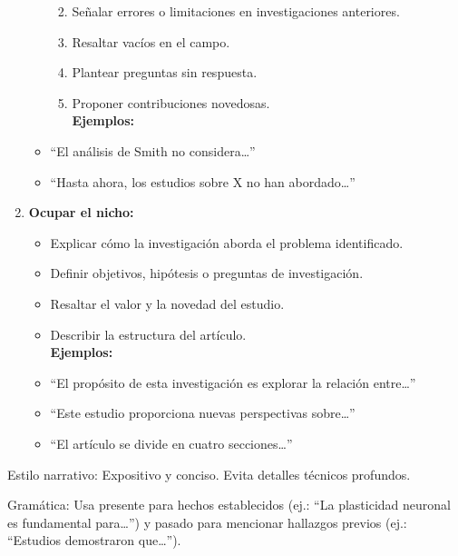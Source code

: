 \documentclass[
]{article}
\providecommand{\tightlist}{%
  \setlength{\itemsep}{0pt}\setlength{\parskip}{0pt}}\usepackage{longtable,booktabs,array}
\begin{document}
\begin{tcolorbox}
\begin{enumerate}
\begin{itemize}
    \begin{enumerate}
    \def\labelenumii{\alph{enumii})}
    \tightlist
    \item
      Señalar errores o limitaciones en investigaciones anteriores.\\
    \item
      Resaltar vacíos en el campo.\\
    \item
      Plantear preguntas sin respuesta.\\
    \item
      Proponer contribuciones novedosas.\\
      \textbf{Ejemplos:}\\
    \end{enumerate}
  \item
    ``El análisis de Smith no considera\ldots{}''\\
  \item
    ``Hasta ahora, los estudios sobre X no han abordado\ldots{}''
  \end{itemize}
\item
  \textbf{Ocupar el nicho:}

  \begin{itemize}
  \tightlist
  \item
    Explicar cómo la investigación aborda el problema identificado.\\
  \item
    Definir objetivos, hipótesis o preguntas de investigación.\\
  \item
    Resaltar el valor y la novedad del estudio.\\
  \item
    Describir la estructura del artículo.\\
    \textbf{Ejemplos:}\\
  \item
    ``El propósito de esta investigación es explorar la relación
    entre\ldots{}''\\
  \item
    ``Este estudio proporciona nuevas perspectivas sobre\ldots{}''\\
  \item
    ``El artículo se divide en cuatro secciones\ldots{}''
  \end{itemize}
\end{enumerate}

Estilo narrativo: Expositivo y conciso. Evita detalles técnicos
profundos.

Gramática: Usa presente para hechos establecidos (ej.: ``La plasticidad
neuronal es fundamental para\ldots{}'') y pasado para mencionar
hallazgos previos (ej.: ``Estudios demostraron que\ldots{}'').

\end{tcolorbox}
\end{document}
